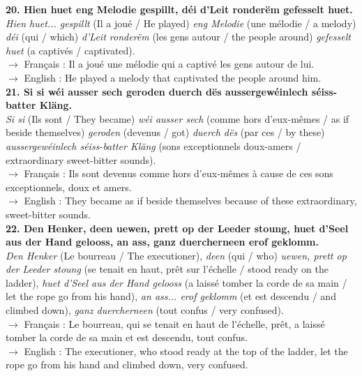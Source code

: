 \textbf{20. Hien huet eng Melodie gespillt, déi d'Leit ronderëm gefesselt huet.}\\
\textit{Hien huet... gespillt} (Il a joué / He played) \textit{eng Melodie} (une mélodie / a melody) \textit{déi} (qui / which) \textit{d'Leit ronderëm} (les gens autour / the people around) \textit{gefesselt huet} (a captivés / captivated).\\
$\rightarrow$ Français : Il a joué une mélodie qui a captivé les gens autour de lui.\\
$\rightarrow$ English : He played a melody that captivated the people around him.\\[0.5em]

\textbf{21. Si si wéi ausser sech geroden duerch dës aussergewéinlech séiss-batter Kläng.}\\
\textit{Si si} (Ils sont / They became) \textit{wéi ausser sech} (comme hors d'eux-mêmes / as if beside themselves) \textit{geroden} (devenus / got) \textit{duerch dës} (par ces / by these) \textit{aussergewéinlech séiss-batter Kläng} (sons exceptionnels doux-amers / extraordinary sweet-bitter sounds).\\
$\rightarrow$ Français : Ils sont devenus comme hors d'eux-mêmes à cause de ces sons exceptionnels, doux et amers.\\
$\rightarrow$ English : They became as if beside themselves because of these extraordinary, sweet-bitter sounds.\\[0.5em]

\textbf{22. Den Henker, deen uewen, prett op der Leeder stoung, huet d'Seel aus der Hand gelooss, an ass, ganz duercherneen erof geklomm.}\\
\textit{Den Henker} (Le bourreau / The executioner), \textit{deen} (qui / who) \textit{uewen, prett op der Leeder stoung} (se tenait en haut, prêt sur l'échelle / stood ready on the ladder), \textit{huet d'Seel aus der Hand gelooss} (a laissé tomber la corde de sa main / let the rope go from his hand), \textit{an ass... erof geklomm} (et est descendu / and climbed down), \textit{ganz duercherneen} (tout confus / very confused).\\
$\rightarrow$ Français : Le bourreau, qui se tenait en haut de l'échelle, prêt, a laissé tomber la corde de sa main et est descendu, tout confus.\\
$\rightarrow$ English : The executioner, who stood ready at the top of the ladder, let the rope go from his hand and climbed down, very confused.




